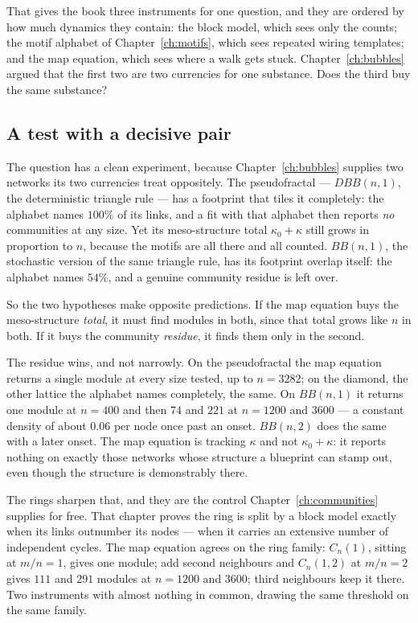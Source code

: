 That gives the book three instruments for one question, and they are ordered by how
much dynamics they contain: the block model, which sees only the counts; the motif
alphabet of Chapter~\ref{ch:motifs}, which sees repeated wiring templates; and the
map equation, which sees where a walk gets stuck. Chapter~\ref{ch:bubbles} argued
that the first two are two currencies for one substance. Does the third buy the same
substance?

\subsection*{A test with a decisive pair}

The question has a clean experiment, because Chapter~\ref{ch:bubbles} supplies two
networks its two currencies treat oppositely. The pseudofractal --- $DBB(n,1)$, the
deterministic triangle rule --- has a footprint that tiles it completely: the alphabet
names $100\%$ of its links, and a fit with that alphabet then reports \emph{no}
communities at any size. Yet its meso-structure total $\kappa_0+\kappa$ still grows in
proportion to $n$, because the motifs are all there and all counted. $BB(n,1)$, the
stochastic version of the same triangle rule, has its footprint overlap itself: the
alphabet names $54\%$, and a genuine community residue is left over.

So the two hypotheses make opposite predictions. If the map equation buys the
meso-structure \emph{total}, it must find modules in both, since that total grows like
$n$ in both. If it buys the community \emph{residue}, it finds them only in the second.



\noindent The residue wins, and not narrowly. On the pseudofractal the map equation
returns a single module at every size tested, up to $n=3282$; on the diamond, the other
lattice the alphabet names completely, the same. On $BB(n,1)$ it returns one module at
$n=400$ and then $74$ and $221$ at $n=1200$ and $3600$ --- a constant density of about
$0.06$ per node once past an onset. $BB(n,2)$ does the same with a later onset. The map
equation is tracking $\kappa$ and not $\kappa_0+\kappa$: it reports nothing on exactly
those networks whose structure a blueprint can stamp out, even though the structure is
demonstrably there.

The rings sharpen that, and they are the control Chapter~\ref{ch:communities} supplies
for free. That chapter proves the ring is split by a block model exactly when its links
outnumber its nodes --- when it carries an extensive number of independent cycles. The
map equation agrees on the ring family: $C_n(1)$, sitting at $m/n=1$, gives one module;
add second neighbours and $C_n(1,2)$ at $m/n=2$ gives $111$ and $291$ modules at $n=1200$
and $3600$; third neighbours keep it there. Two instruments with almost nothing in
common, drawing the same threshold on the same family.

